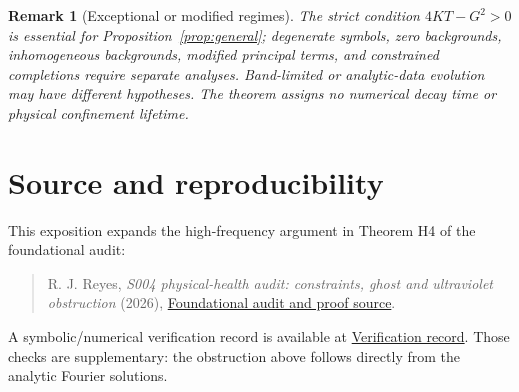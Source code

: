 \documentclass[11pt]{article}
\newtheorem{remark}[theorem]{Remark}
\begin{document}
\begin{remark}[Exceptional or modified regimes]
The strict condition \(4KT-G^2>0\) is essential for Proposition~\ref{prop:general}; degenerate symbols, zero backgrounds, inhomogeneous backgrounds, modified principal terms, and constrained completions require separate analyses. Band-limited or analytic-data evolution may have different hypotheses. The theorem assigns no numerical decay time or physical confinement lifetime.
\end{remark}

\section*{Source and reproducibility}
This exposition expands the high-frequency argument in Theorem H4 of the foundational audit:
\begin{quote}
R. J. Reyes, \emph{S004 physical-health audit: constraints, ghost and ultraviolet obstruction} (2026),
\href{https://github.com/rickyjreyes/geometry_of_resonance/blob/main/docs/foundational/GHOST_AND_CONSTRAINT_ANALYSIS.md}{Foundational audit and proof source}.
\end{quote}
A symbolic/numerical verification record is available at
\href{https://github.com/rickyjreyes/geometry_of_resonance/blob/main/audit/foundational/verification.json}{Verification record}.
Those checks are supplementary: the obstruction above follows directly from the analytic Fourier solutions.
\end{document}
